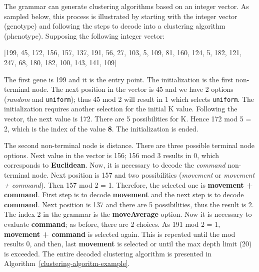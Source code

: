 \documentclass[conference]{IEEEtran}
\begin{document}
	
	The grammar can generate clustering algorithms based on an integer vector. As sampled below, this process is illustrated by starting with the integer vector (genotype) and following the steps to decode into a clustering algorithm (phenotype). 
	Supposing the following integer vector:
	
	\vspace{0.2cm}
	
	[199, 45, 172, 156, 157, 137, 191, 56, 27, 103, 5, 109, 81, 160, 124, 5, 182, 121, 247, 68, 180, 182, 100, 143, 141, 109]
	
	\vspace{0.2cm}
	
	
	The first gene is 199 and it is the entry point. The initialization is the first non-terminal node. The next position in the vector is 45 and we have 2 options (\textit{random} and \texttt{uniform}); thus 45 mod 2 will result in 1 which selects \texttt{uniform}. The initialization requires another selection for the initial K value. Following the vector, the next value is 172. There are 5 possibilities for K. Hence 172 mod 5 = 2, which is the index of the value \textbf{8}. The initialization is ended. 
	
	The second non-terminal node is distance. There are three possible terminal node options. Next value in the vector is 156; 156 mod 3 results in 0, which corresponds to \textbf{Euclidean}. Now, it is necessary to decode the \textit{command} non-terminal node. Next position is 157 and two possibilities (\textit{movement} or \textit{movement + command}). Then 157 mod 2 = 1. Therefore, the selected one is \textbf{movement + command}. First step is to decode \textbf{movement} and the next step  is to  decode  \textbf{command}. Next position is 137 and there are 5 possibilities, thus the result is 2. The index 2 in the grammar is the \textbf{moveAverage} option. Now it is necessary to evaluate \textbf{command}; as before, there are 2 choices. As 191 mod 2 = 1, \textbf{movement + command} is selected again. This is repeated until the mod results 0,  and then, last \textbf{movement} is selected or until the max depth limit (20) is exceeded. The entire decoded clustering algorithm is presented in Algorithm~\ref{clustering-algoritm-example}.
	
\end{document}
